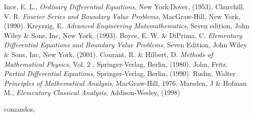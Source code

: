 \onehalfspacing
\thispagestyle{empty}
%

%

\tableofcontents
\cleardoublepage
\listoffigures
\cleardoublepage
\listoftables
\cleardoublepage
\pagestyle{fancy}               	%




	
\appendix
%
%

\cleardoublepage
%
%

\cleardoublepage
%
%


\begin{thebibliography}{99}
 Ince, E. L., \emph{Ordinary Differential Equations}, New York:Dover, (1953).
 Churchill, V. R. \emph{Fourier Series and Boundary Value Problems},
MacGraw-Hill, New York, (1990).
 Kreyszig, E. \emph{Advanced Engineering Matemathematics},
Seven edition, John Wiley \& Sons, Inc, New York, (1993).
 Boyce, E. W. \& DiPrima, C. \emph{Elementary Differential Equations and
Boundary Value Problems}, Seven Edition, John Wiley \& Sons, Inc, New York, (2001).
 Courant, R. \& Hilbert, D. \emph{
Methods of Mathematical Physics}, Vol. 2 ,
Springer-Verlag, Berlin, (1980).
 John, Fritz. \emph{Partial Differential Equations},
Springer-Verlag, Berlin, (1990).
 Rudin, Walter \emph{Principles of Mathematical Analysis},
MacGraw-Hill, 1976.
 Marsden, J \& Hofman M., \emph{Elementary Classical Analysis}, Addison-Wesley, (1998)
\end{thebibliography}
\begin{theindex}
\item comandos,
\subitem
\subitem
\indexspace
\item
\end{theindex}

